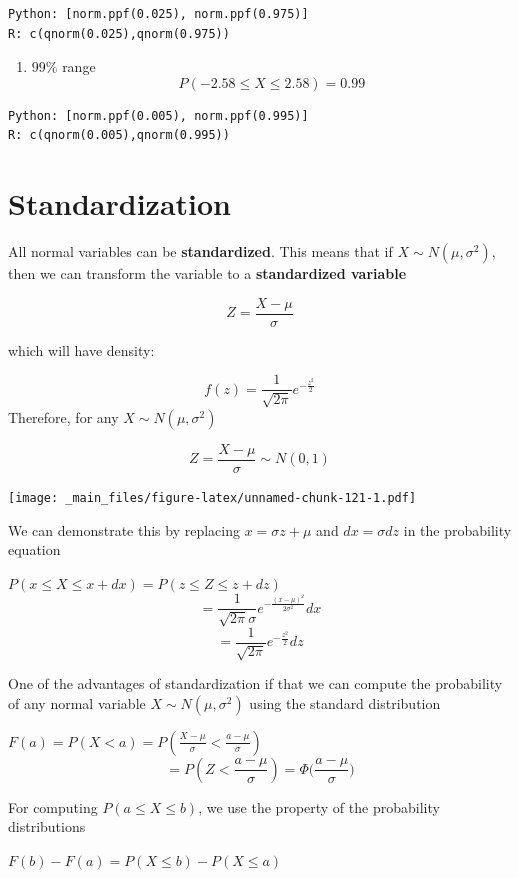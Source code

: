 \documentclass[
]{book}
\providecommand{\tightlist}{%
  \setlength{\itemsep}{0pt}\setlength{\parskip}{0pt}}
\begin{document}
\begin{verbatim}
Python: [norm.ppf(0.025), norm.ppf(0.975)]
R: c(qnorm(0.025),qnorm(0.975))
\end{verbatim}

\begin{enumerate}
\def\labelenumi{\arabic{enumi})}
\setcounter{enumi}{2}
\tightlist
\item
  \(99\%\) range \[P(-2.58 \leq X \leq 2.58)=0.99\]
\end{enumerate}

\begin{verbatim}
Python: [norm.ppf(0.005), norm.ppf(0.995)]
R: c(qnorm(0.005),qnorm(0.995))
\end{verbatim}

\hypertarget{standardization}{%
\section{Standardization}\label{standardization}}

All normal variables can be \textbf{standardized}. This means that if \(X \sim N(\mu, \sigma^2)\), then we can transform the variable to
a \textbf{standardized variable}

\[Z=\frac{X-\mu}{\sigma}\]

which will have density:

\[f(z)=\frac{1}{ \sqrt{2\pi}}e^{-\frac{z^2}{2}}\]
Therefore, for any \(X \sim N(\mu, \sigma^2)\)

\[Z=\frac{X-\mu}{\sigma} \sim N(0, 1) \]

\texttt{[image: \_main\_files/figure-latex/unnamed-chunk-121-1.pdf]}

We can demonstrate this by replacing \(x=\sigma z+\mu\) and \(dx=\sigma dz\) in the probability equation

\(P(x\leq X \leq x +dx)=P(z\leq Z \leq z +dz)\)
\[=\frac{1}{\sqrt{2\pi}\sigma}e^{-\frac{(x-\mu)^2}{2\sigma^2}}dx\] \[=\frac{1}{ \sqrt{2\pi}}e^{-\frac{z^2}{2}} dz\]

One of the advantages of standardization if that we can compute the probability of any normal variable \(X\sim N(\mu, \sigma^2)\) using the standard distribution

\(F(a)=P(X<a)=P(\frac{X-\mu}{\sigma}<\frac{a-\mu}{\sigma})\)
\[=P(Z < \frac{a-\mu}{\sigma})= \Phi \big(\frac{a-\mu}{\sigma}\big)\]

For computing \(P(a\leq X \leq b)\), we use the property of the probability distributions

\(F(b)-F(a)=P(X\leq b)-P(X\leq a)\)
\end{document}
